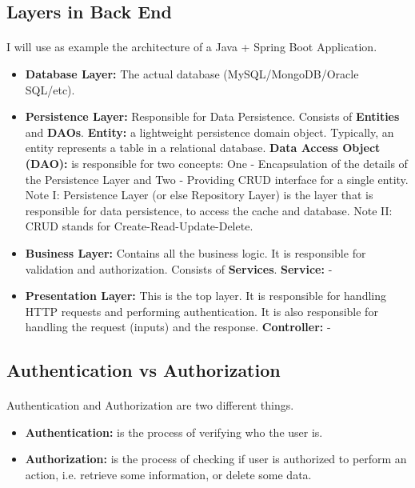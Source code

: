 \documentclass{article}
\begin{document}
\subsection{Layers in Back End}
\paragraph{} I will use as example the architecture of a Java + Spring Boot Application.
\begin{itemize}
	\item \textbf{Database Layer:} The actual database (MySQL/MongoDB/Oracle SQL/etc).
	\item \textbf{Persistence Layer:} Responsible for Data Persistence. Consists of \textbf{Entities} and \textbf{DAOs}.
		\subitem \textbf{Entity:} a lightweight persistence domain object. Typically, an entity represents a table in a relational database.
		\subitem \textbf{Data Access Object (DAO):} is responsible for two concepts:
			\subsubitem One - Encapsulation of the details of the Persistence Layer and
			\subsubitem Two - Providing CRUD interface for a single entity.
			\subsubitem Note I: Persistence Layer (or else Repository Layer) is the layer that is responsible for data persistence, to access the cache and database.
			\subsubitem Note II: CRUD stands for Create-Read-Update-Delete.
	\item \textbf{Business Layer:} Contains all the business logic. It is responsible for  validation and authorization. Consists of \textbf{Services}.
		\subitem \textbf{Service:} -
	\item \textbf{Presentation Layer:} This is the top layer. It is responsible for handling HTTP requests and performing authentication. It is also responsible for handling the request (inputs) and the response.
		\subitem \textbf{Controller:} -
\end{itemize}
\subsection{Authentication vs Authorization}
\paragraph{} Authentication and Authorization are two different things.
\begin{itemize}
	\item \textbf{Authentication:} is the process of verifying who the user is.
	\item \textbf{Authorization:} is the process of checking if user is authorized to perform an action, i.e. retrieve some information, or delete some data.
\end{itemize}
\end{document}
